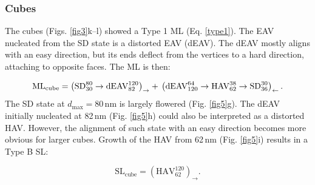 \documentclass[review,authoryear]{elsarticle}
\newcommand{\dmax}{d_\text{max}}
\newcommand{\nm}{\,\text{nm}}
\begin{document}
\subsubsection{Cubes}
The cubes (Figs. \ref{fig3}k--l) showed a Type 1 ML (Eq. \ref{type1}). The EAV nucleated from the SD state is a distorted EAV (dEAV). The dEAV mostly aligns with an easy direction, but its ends deflect from the vertices to a hard direction, attaching to opposite faces. The ML is then:
{\par\nobreak\noindent}
\begin{equation}
\text{ML}_{\text{cube}}=\left(\text{SD}_{30}^{80}\rightarrow\text{dEAV}_{82}^{120}\right)_{\rightarrow} + \\
\left(\text{dEAV}_{120}^{64}\rightarrow\text{HAV}_{62}^{38}\rightarrow\text{SD}_{36}^{30}\right)_{\leftarrow}.
\end{equation}
The SD state at $\dmax=80\,\text{nm}$ is largely flowered (Fig. \ref{fig5}g). The dEAV initially nucleated at 82$\nm$ (Fig. \ref{fig5}h) could also be interpreted as a distorted HAV. However, the alignment of such state with an easy direction becomes more obvious for larger cubes. Growth of the HAV from 62$\nm$ (Fig. \ref{fig5}i) results in a Type B SL:
{\par\nobreak\noindent}
\begin{equation}
\text{SL}_{\text{cube}}=\left(\text{HAV}_{62}^{120}\right)_{\rightarrow}.
\end{equation}
\par
\end{document}
